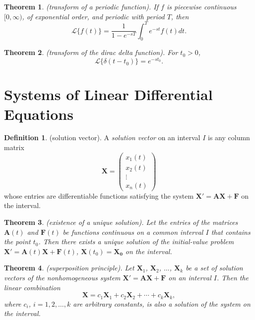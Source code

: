 \documentclass{article}
\theoremstyle{plain}
\newtheorem{thm}{Theorem}[section]
\theoremstyle{definition}
\newtheorem{defn}{Definition}[section]
\theoremstyle{remark}
\begin{document}
\begin{thm} (transform of a periodic function).
    If \(f\) is piecewise continuous \([0,\infty)\), of exponential order, and periodic with period \(T\), then
    \begin{equation}
        \mathcal{L} \{f(t)\} = \frac{1}{1-e^{-sT}} \int_0^T e^{-st} f(t) dt.
    \end{equation}
\end{thm}

\begin{thm} (transform of the dirac delta function).
    For \(t_0 > 0\),
    \begin{equation}
        \mathcal{L} \{\delta(t - t_0)\} = e^{-st_0}.
    \end{equation}
\end{thm}

\section{Systems of Linear Differential Equations}

\begin{defn} (solution vector).
    A \emph{solution vector} on an interval \(I\) is any column matrix
    \begin{equation}
        \mathbf{X} = \begin{pmatrix}
            x_1(t) \\
            x_2(t) \\
            \vdots \\
            x_n(t)
        \end{pmatrix}
    \end{equation}
    \noindent whose entries are differentiable functions satisfying the system \(\mathbf{X'} = \mathbf{AX} + \mathbf{F}\) on the interval.
\end{defn}

\begin{thm} (existence of a unique solution).
    Let the entries of the matrices \(\mathbf{A}(t)\) and \(\mathbf{F}(t)\) be functions continuous on a common interval \(I\) that contains the point \(t_0\). Then there exists a unique solution of the initial-value problem \(\mathbf{X'} = \mathbf{A}(t)\mathbf{X} + \mathbf{F}(t)\), \(\mathbf{X}(t_0) = \mathbf{X_0}\) on the interval.
\end{thm}

\begin{thm} (superposition principle).
    Let \(\mathbf{X}_1\), \(\mathbf{X}_2\), \(\ldots\), \(\mathbf{X}_k\) be a set of solution vectors of the nonhomogeneous system \(\mathbf{X'} = \mathbf{A}\mathbf{X} + \mathbf{F}\) on an interval \(I\). Then the linear combination
    \begin{equation}
        \mathbf{X} = c_1\mathbf{X}_1 + c_2\mathbf{X}_2 + \cdots + c_k\mathbf{X}_k,
    \end{equation}
    \noindent where \(c_i\), \(i = 1, 2, \ldots, k\) are arbitrary constants, is also a solution of the system on the interval.
    
\end{thm}
\end{document}
